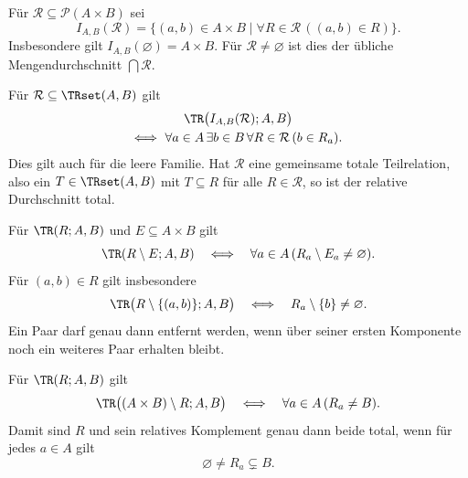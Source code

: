 \begin{definition}
Für $\mathcal R\subseteq\mathcal P(A\times B)$ sei
\[
 I_{A,B}(\mathcal R)
 =\{(a,b)\in A\times B\mid
                         \forall R\in\mathcal R\,((a,b)\in R)\}.
\]
Insbesondere gilt $I_{A,B}(\varnothing)=A\times B$.
Für $\mathcal R\ne\varnothing$ ist dies der übliche
Mengendurchschnitt $\bigcap\mathcal R$.
\end{definition}

\begin{theorem}
\label{b04guide:thm:familyintersection}
Für $\mathcal R\subseteq\TRset(A,B)$ gilt
\[
 \begin{gathered}
 \TR\bigl(I_{A,B}(\mathcal R);A,B\bigr)\\
 \Longleftrightarrow\
 \forall a\in A\,\exists b\in B\,
                      \forall R\in\mathcal R\,(b\in R_a).
 \end{gathered}
\]
Dies gilt auch für die leere Familie.
Hat $\mathcal R$ eine gemeinsame totale Teilrelation, also ein
$T\in\TRset(A,B)$ mit $T\subseteq R$ für alle
$R\in\mathcal R$, so ist der relative Durchschnitt total.
\end{theorem}

\begin{theorem}
\label{b04guide:thm:difference}
Für $\TR(R;A,B)$ und $E\subseteq A\times B$ gilt
\[
 \TR(R\setminus E;A,B)
 \quad\Longleftrightarrow\quad
 \forall a\in A\,(R_a\setminus E_a\ne\varnothing).
\]
Für $(a,b)\in R$ gilt insbesondere
\[
 \TR\bigl(R\setminus\{(a,b)\};A,B\bigr)
 \quad\Longleftrightarrow\quad R_a\setminus\{b\}\ne\varnothing.
\]
Ein Paar darf genau dann entfernt werden, wenn über seiner
ersten Komponente noch ein weiteres Paar erhalten bleibt.
\end{theorem}

\begin{theorem}
\label{b04guide:thm:complement}
Für $\TR(R;A,B)$ gilt
\[
 \TR\bigl((A\times B)\setminus R;A,B\bigr)
 \quad\Longleftrightarrow\quad
 \forall a\in A\,(R_a\ne B).
\]
Damit sind $R$ und sein relatives Komplement genau dann beide
total, wenn für jedes $a\in A$ gilt
\[
 \varnothing\ne R_a\subsetneq B.
\]
\end{theorem}
